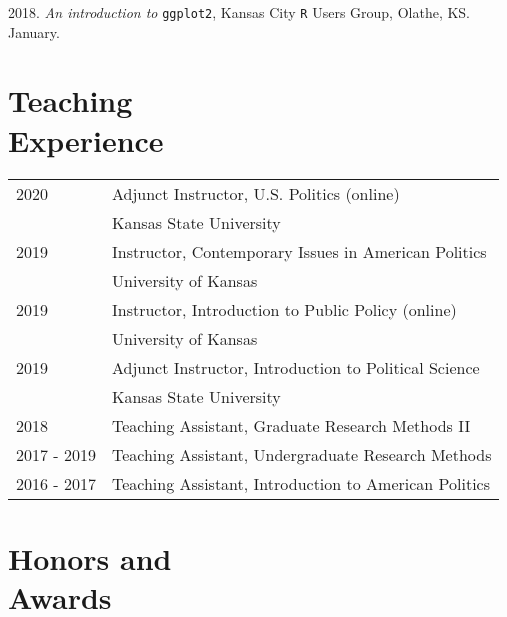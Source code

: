 \documentclass[margin,line,pifont,palatino,courier]{res}
\begin{document}
\begin{resume}
2018. \emph{An introduction to} \verb+ggplot2+, Kansas City \verb+R+ Users Group,
Olathe, KS. January.

\newpage
\section{\sc Teaching\\ Experience}

\begin{tabular}{@{}p{0.8in}p{3.5in}}
  2020        & Adjunct Instructor, U.S. Politics (online)\\
              & Kansas State University\\
  2019        & Instructor, Contemporary Issues in American Politics\\
              & University of Kansas\\
  2019        & Instructor, Introduction to Public Policy (online) \\
              & University of Kansas \\
  2019        & Adjunct Instructor, Introduction to Political Science\\
              & Kansas State University\\
  2018        & Teaching Assistant, Graduate Research Methods II\\
  2017 - 2019 & Teaching Assistant, Undergraduate Research Methods\\
  2016 - 2017 & Teaching Assistant, Introduction to American Politics\\
\end{tabular}



\section{\sc Honors and\\ Awards}


\end{resume}
\end{document}
